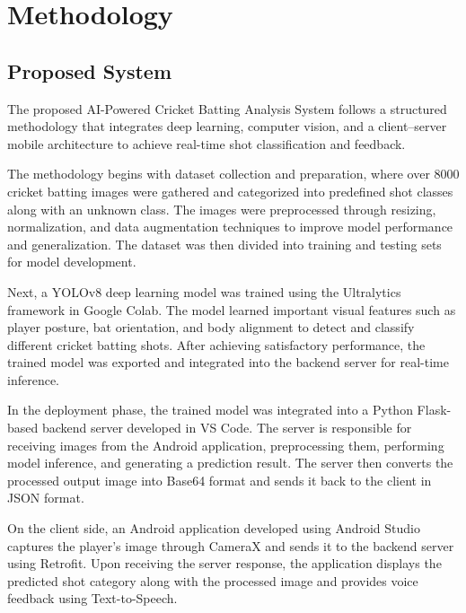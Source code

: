 \chapter{Methodology}
\label{C4} %
\graphicspath{{Figures/Chapter-4figs/PDF/}{Figures/Chapter-4figs/}}
\section{Proposed System} \label{S4.1}
The proposed AI-Powered Cricket Batting Analysis System follows a structured methodology that integrates deep learning, computer vision, and a client–server mobile architecture to achieve real-time shot classification and feedback.

The methodology begins with dataset collection and preparation, where over 8000 cricket batting images were gathered and categorized into predefined shot classes along with an unknown class. The images were preprocessed through resizing, normalization, and data augmentation techniques to improve model performance and generalization. The dataset was then divided into training and testing sets for model development.

Next, a YOLOv8 deep learning model was trained using the Ultralytics framework in Google Colab. The model learned important visual features such as player posture, bat orientation, and body alignment to detect and classify different cricket batting shots. After achieving satisfactory performance, the trained model was exported and integrated into the backend server for real-time inference.

In the deployment phase, the trained model was integrated into a Python Flask-based backend server developed in VS Code. The server is responsible for receiving images from the Android application, preprocessing them, performing model inference, and generating a prediction result. The server then converts the processed output image into Base64 format and sends it back to the client in JSON format.

On the client side, an Android application developed using Android Studio captures the player’s image through CameraX and sends it to the backend server using Retrofit. Upon receiving the server response, the application displays the predicted shot category along with the processed image and provides voice feedback using Text-to-Speech.

